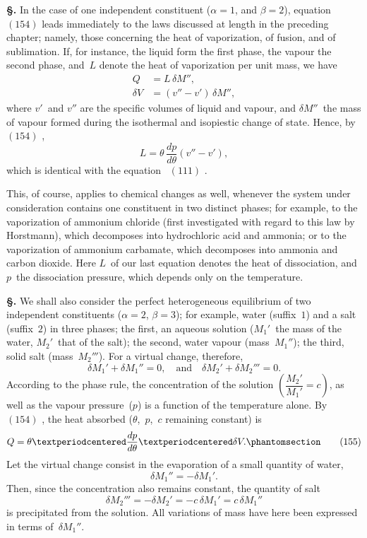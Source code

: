 \documentclass[12pt]{book}[2005/09/16]
\newcommand{\Chg}[2]{#2}
\newcommand{\Add}[1]{\Chg{}{#1}}
\newcommand{\Section}[1]{
  \medskip\par\textbf{§\;#1}
  \label{section:#1}
}
\newcommand{\Tag}[1]{%
  \phantomsection\label{eqn:#1}\tag*{\ensuremath{#1}}%
}
\newcommand{\Eq}[1]{%
  \hyperref[eqn:#1]{\ensuremath{#1}}%
}
\newcommand{\PageSep}[1]{\ignorespaces}
\begin{document}
\Section{213.} In the case of one independent constituent ($\alpha = 1$,
%
and $\beta = 2$), equation~\Eq{(154)} leads immediately to the laws
discussed at length in the preceding chapter; namely, those
concerning the heat of vaporization, of fusion, and of sublimation.
If, for instance, the liquid form the first phase, the
vapour the second phase, and~$L$ denote the heat of vaporization
per unit mass, we have
\begin{align*}
Q &= L\, \delta M''\Add{,} \\
\delta V &= (v'' - v')\, \delta M''\Add{,}
\end{align*}
where $v'$~and $v''$ are the specific volumes of liquid and vapour,
and $\delta M''$~the mass of vapour formed during the isothermal
and isopiestic change of state. Hence, by~\Eq{(154)},
\[
L = \theta\, \frac{dp}{d\theta} (v'' - v'),
\]
which is identical with the equation~\Eq{(111)}.

This, of course, applies to chemical changes as well,
\PageSep{188}
%
%
whenever the system under consideration contains one constituent
in two distinct phases; for example, to the vaporization
of ammonium chloride (first investigated with regard
to this law by Horstmann), which decomposes into hydrochloric
%
acid and ammonia; or to the vaporization of
ammonium carbamate, which decomposes into ammonia and
carbon dioxide. Here $L$~of our last equation denotes the
heat of dissociation, and $p$~the dissociation pressure, which
depends only on the temperature.

\Section{214.} We shall also consider the perfect heterogeneous
equilibrium of two independent constituents ($\alpha = 2$, $\beta = 3$);
for example, water (suffix~$1$) and a salt (suffix~$2$) in three
phases; the first, an aqueous solution ($M_{1}'$~the mass of the
water, $M_{2}'$~that of the salt); the second, water vapour
(mass~$M_{1}''$); the third, solid salt (mass~$M_{2}'''$). For a virtual
change, therefore,
\[
\delta M_{1}' + \delta M_{1}'' = 0,\quad\text{and}\quad
\delta M_{2}' + \delta M_{2}''' = 0.
\]
According to the phase rule, the concentration of the
solution $\left(\dfrac{M_{2}'}{M_{1}'} = c\right)$, as well as the vapour pressure~($p$) is a
function of the temperature alone. By~\Eq{(154)}, the heat
absorbed ($\theta$,~$p$,~$c$ remaining constant) is
\[
Q = \theta · \frac{dp}{d\theta} · \delta V.
\Tag{(155)}
\]
Let the virtual change consist in the evaporation of a
%
%
small quantity of water,
\[
\delta M_{1}'' = - \delta M_{1}'.
\]
Then, since the concentration also remains constant, the
quantity of salt
\[
\delta M_{2}''' = -\delta M_{2}' = -c\, \delta M_{1}' = c\, \delta M_{1}''
\]
is precipitated from the solution. All variations of mass
have here been expressed in terms of~$\delta M_{1}''$.
\PageSep{189}
\end{document}
